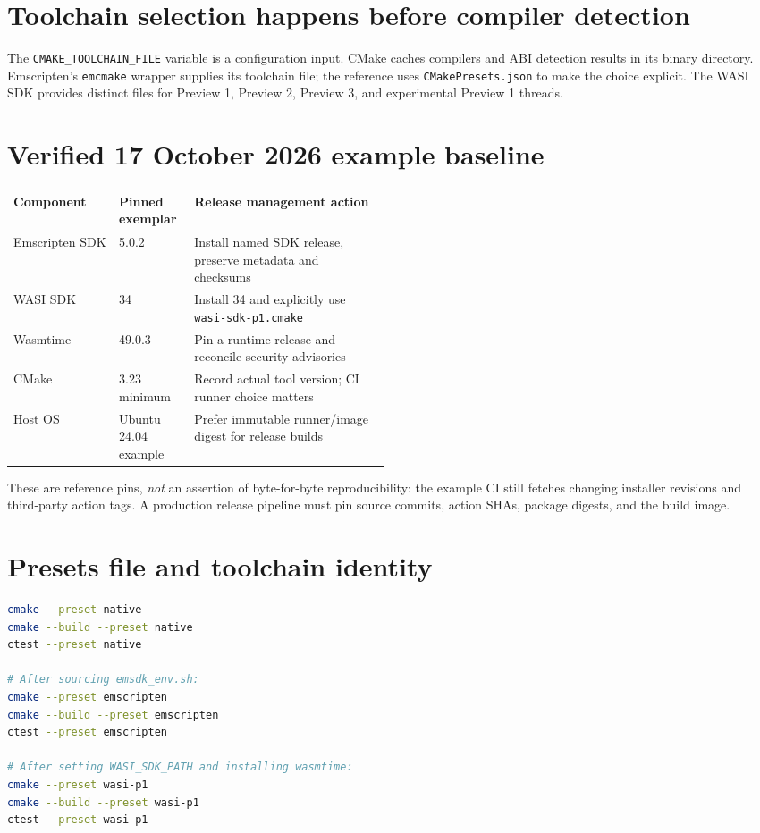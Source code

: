 \documentclass[11pt,letterpaper]{article}
\begin{document}
\frontmatterdoc
\section{Toolchain selection happens before compiler detection}
The \texttt{CMAKE\_TOOLCHAIN\_FILE} variable is a configuration input. CMake caches compilers and ABI detection results in its binary directory. Emscripten's \texttt{emcmake} wrapper supplies its toolchain file; the reference uses \texttt{CMakePresets.json} to make the choice explicit. The WASI SDK provides distinct files for Preview 1, Preview 2, Preview 3, and experimental Preview 1 threads.

\section{Verified 17 October 2026 example baseline}
\noindent\begin{tabularx}{\linewidth}{p{0.29\linewidth}p{0.20\linewidth}X}
\toprule Component & Pinned exemplar & Release management action \\ \midrule
Emscripten SDK & 5.0.2 & Install named SDK release, preserve metadata and checksums \\
WASI SDK & 34 & Install 34 and explicitly use \texttt{wasi-sdk-p1.cmake} \\
Wasmtime & 49.0.3 & Pin a runtime release and reconcile security advisories \\
CMake & 3.23 minimum & Record actual tool version; CI runner choice matters \\
Host OS & Ubuntu 24.04 example & Prefer immutable runner/image digest for release builds \\
\bottomrule
\end{tabularx}
These are reference pins, \emph{not} an assertion of byte-for-byte reproducibility: the example CI still fetches changing installer revisions and third-party action tags. A production release pipeline must pin source commits, action SHAs, package digests, and the build image.

\section{Presets file and toolchain identity}


\begin{lstlisting}[language=bash,caption={Repeatable local invocations}]
cmake --preset native
cmake --build --preset native
ctest --preset native

# After sourcing emsdk_env.sh:
cmake --preset emscripten
cmake --build --preset emscripten
ctest --preset emscripten

# After setting WASI_SDK_PATH and installing wasmtime:
cmake --preset wasi-p1
cmake --build --preset wasi-p1
ctest --preset wasi-p1
\end{lstlisting}
\end{document}
